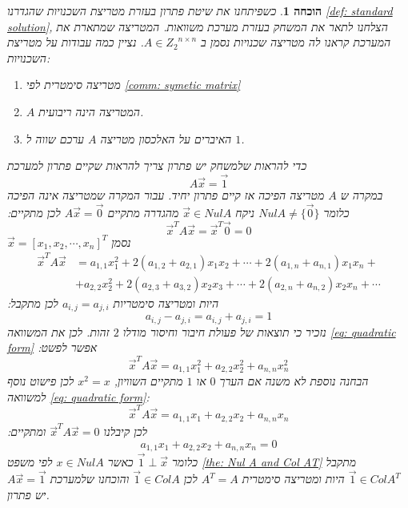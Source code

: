 \documentclass[12pt,leqno]{article}
\theoremstyle{theoremdd}
\newtheorem*{prove}{הוכחה}
\begin{document}
\begin{prove}
    כשפיתחנו את 
    שיטת פתרון 
    בעזרת מטריצת השכנויות 
    שהגדרנו
    \ref{def: standard solution},
    הצלחנו לתאר את המשחק בעזרת 
    מערכת משוואות.
    המטריצה שמתארת את המערכת קראנו לה מטריצה שכנויות
    נסמן ב
    $A \in {Z_2}^{n \times n}$.
    נציין כמה עבודות על מטריצת השכנויות:
    \begin{enumerate}
        \item 
        מטריצה סימטרית לפי
        \ref{comm: symetic matrix}
        \item 
        $A$
        המטריצה הינה ריבועית.
        \item 
        האיברים על האלכסון
        מטריצה 
        $A$
        ערכם שווה ל
        $1$.
    \end{enumerate}

    כדי להראות שלמשחק יש פתרון 
    צריך להראות שקיים פתרון למערכת
    \[A \vec{x} = \vec{1} \]
    במקרה ש 
    $A$
    מטריצה הפיכה אז קיים פתרון יחיד.
    עבור המקרה שמטריצה אינה הפיכה 
    כלומר 
    $Nul A \neq \{ \vec{0}\}$
    ניקח 
    $\vec{x} \in Nul A$
    מהגדרה מתקיים
    $A\vec{x} = \vec{0}$
    לכן מתקיים:
    \[\vec{x}^T A \vec{x} = \vec{x}^T\vec{0} = 0\]
    נסמן 
    $\vec{x} = [x_1, x_2, \cdots, x_n]^T$
    \begin{align}
        \label{eq: quadratic form}
            \vec{x}^T A \vec{x} &= a_{1,1}x_1^2 + 2(a_{1,2} + a_{2,1})x_1x_2 + \cdots + 2(a_{1,n} + a_{n,1})x_1x_n +  \\
            \nonumber &+ a_{2,2}x_2^2 +  2(a_{2,3} + a_{3,2})x_2x_3 + \cdots  + 2(a_{2,n} + a_{n,2})x_2x_n + \cdots 
    \end{align}
    היות ומטריצה סימטריות
    $a_{i,j} = a_{j,i}$
    לכן
    מתקבל:
    \[a_{i,j} - a_{j,i} = a_{i,j} + a_{j,i} = 1 \]
    נזכיר כי תוצאות של פעולת חיבור וחיסור מודלו 
    $2$
    זהות.
    לכן
    את המשוואה 
    \ref{eq: quadratic form}
    אפשר לפשט:
    \[ \vec{x}^T A \vec{x} = a_{1,1}x_1^2 + a_{2,2} x_2^2 +  a_{n,n} x_n^2\]
    הבחנה נוספת
    לא משנה אם הערך 
    $0$
    או
    $1$
    מתקיים השוויון,
    $x^2 = x$
    לכן פישוט נוסף למשוואה 
    \ref{eq: quadratic form}:
    \[ \vec{x}^T A \vec{x} = a_{1,1}x_1 + a_{2,2} x_2 +  a_{n,n} x_n\]
    לכן קיבלנו 
    $ \vec{x}^T A \vec{x} = 0$
    ומתקיים:
    \[a_{1,1}x_1 + a_{2,2} x_2 +  a_{n,n} x_n = 0\]
    כלומר 
    $\vec{1} \perp  \vec{x}$
    כאשר 
    $x \in Nul A$
    לפי משפט 
    \ref{the: Nul A and Col AT}
    מתקבל 
    $\vec{1} \in Col A^T$
    היות ומטריצה סימטרית 
    $A^T = A$
    לכן
    $\vec{1} \in Col A$
    והוכחנו שלמערכת
    $A\vec{x} = \vec{1}$
    יש פתרון.
\end{prove}
\end{document}
